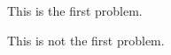 \documentclass{homework}
\begin{document}
\problem This is the first problem.

 This is not the first problem.
\end{document}
